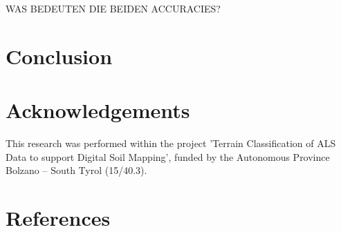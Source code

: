 \documentclass[preprint,12pt,authoryear]{elsarticle}
\begin{document}
WAS BEDEUTEN DIE BEIDEN ACCURACIES?

\section{Conclusion}
 

\section*{Acknowledgements} This research was performed within the project 'Terrain Classification of ALS Data to support Digital Soil Mapping', funded by the Autonomous Province Bolzano -- South Tyrol (15/40.3).

\section*{References}

\end{document}
